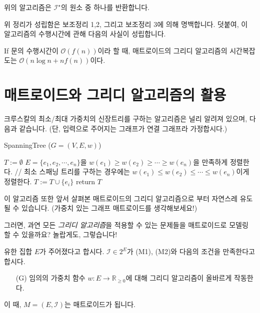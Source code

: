 \documentclass[11pt, a4paper]{book}
\newcommand{\I}{\mathcal{I}}
\begin{document}
    \begin{MLThm}
        위의 알고리즘은 $\I^\star$의 원소 중 하나를 반환합니다.
    \end{MLThm}
    
    위 정리가 성립함은 보조정리 1,2, 그리고 보조정리 3에 의해 명백합니다. 덧붙여, 이 알고리즘의 수행시간에 관해 다음의 사실이 성립합니다.
    
    \begin{MLPrp}
        If 문의 수행시간이 $\mathcal{O}(f(n))$이라 할 때, 매트로이드의 그리디 알고리즘의 시간복잡도는 $\mathcal{O}(n \log n + n f(n))$이다.
    \end{MLPrp}
    
    \section{매트로이드와 그리디 알고리즘의 활용}
    
    크루스칼의 최소/최대 가중치의 신장트리를 구하는 알고리즘은 널리 알려져 있으며, 다음과 같습니다. (단, 입력으로 주어지는 그래프가 연결 그래프라 가정합시다.)
    
    \begin{algorithm}
        SpanningTree ($G = (V, E, w)$)
        \begin{algorithmic}
            \STATE $T := \emptyset$
            \STATE $E = \{e_1, e_2, \cdots, e_n\}$을 $w(e_1) \ge w(e_2) \ge \cdots \ge w(e_n)$을 만족하게 정렬한다. // 최소 스패닝 트리를 구하는 경우에는 $w(e_1) \le w(e_2) \le \cdots \le w(e_n)$이게 정렬한다.
                    \STATE $T := T \cup \{e_i\}$
                \ENDIF
            \ENDFOR
            \STATE return $T$
        \end{algorithmic}
    \end{algorithm}
    
    이 알고리즘 또한 앞서 살펴본 매트로이드의 그리디 알고리즘으로 부터 자연스레 유도될 수 있습니다. (가중치 있는 그래프 매트로이드를 생각해보세요!)
    
    그러면, 과연 모든 \emph{그리디 알고리즘}을 적용할 수 있는 문제들을 매트로이드로 모델링 할 수 있을까요? 놀랍게도, 그렇습니다!
    
    \begin{MLThm}
        유한 집합 $E$가 주어졌다고 합시다. $\I \in 2^E$가 (M1), (M2)와 다음의 조건을 만족한다고 합시다.
        \begin{itemize}
            \item[(G)] 임의의 가중치 함수 $w : E \to \mathbb{R}_{\ge0}$에 대해 그리디 알고리즘이 올바르게 작동한다.
        \end{itemize}
        이 때, $M = (E, \I)$는 매트로이드가 됩니다.
    \end{MLThm}
    
\end{document}
